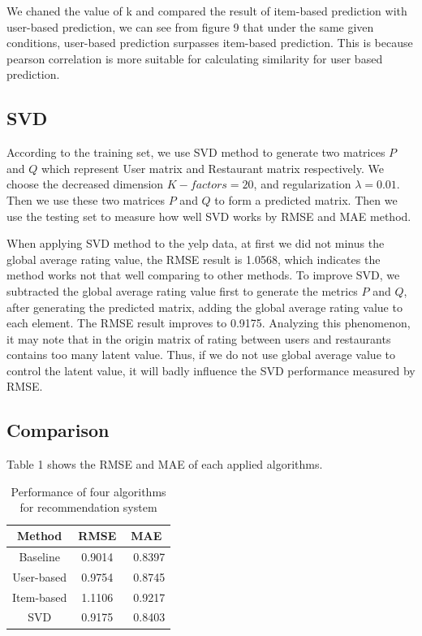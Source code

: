 \documentclass{llncs}
\begin{document}
We chaned the value of k and compared the result of item-based prediction with user-based prediction, we can see from figure 9 that under the same given conditions, user-based prediction surpasses item-based prediction. This is because pearson correlation is more suitable for calculating similarity for user based prediction. 

\subsection{SVD}
According to the training set, we use SVD method to generate two matrices $P$ and $Q$ which represent User matrix and Restaurant matrix respectively. We choose the decreased dimension $K-factors = 20$, and regularization $\lambda = 0.01$. Then we use these two matrices $P$ and $Q$ to form a predicted matrix. Then we use the testing set to measure how well SVD works by RMSE and MAE method.

When applying SVD method to the yelp data, at first we did not minus the global average rating value, the RMSE result is 1.0568, which indicates the method works not that well comparing to other methods. To improve SVD, we subtracted the global average rating value first to generate the metrics $P$ and $Q$, after generating the predicted matrix, adding the global average rating value to each element. The RMSE result improves to  0.9175. Analyzing this phenomenon, it may note that in the origin matrix of rating between users and restaurants contains too many latent value. Thus, if we do not use global average value to control the latent value, it will badly influence the SVD performance measured by RMSE.

\subsection{Comparison}
Table 1 shows the RMSE and MAE of each applied algorithms.
\begin{table}
	\caption{Performance of four algorithms for recommendation system}
	\begin{center}
		\begin{tabular}{ccc}
			\hline
				\rule{0pt}{12pt}Method  & \rule{0pt}{12pt}RMSE   &\rule{0pt}{12pt} MAE\\
			\hline\rule{0pt}{12pt}
			Baseline    &   0.9014 & \ 	0.8397 \\
			User-based  &   0.9754 & \ 	0.8745\\
			Item-based  &   1.1106 & \      0.9217\\
			SVD         &   0.9175 & \      0.8403\\
			\hline
		\end{tabular}
	\end{center}
\end{table}
\end{document}
